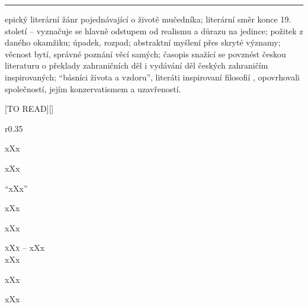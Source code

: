 \documentclass{extarticle} %
\begin{document}
\vfill

\noindent\begin{minipage}{\textwidth}
    {\textcolor{\wpagecolor}{\rule{\linewidth}{0.4pt}}
    \footnotesize
     epický literární žánr pojednávající o životě mučedníka;
     literární směr konce 19. století -- vyznačuje se hlavně odstupem od realismu a důrazu na jedince;
     požitek z daného okamžiku;
     úpadek, rozpad;
     abstraktní myšlení přes skryté významy;
     věcnost bytí, správné poznání věcí samých;
     časopis snažící se povznést českou literaturu o překlady zahraničních děl i vydávání děl českých zahraničím inspirovaných;
     \enquote{básníci života a vzdoru}, literáti inspirovaní filosofií , opovrhovali společností, jejím konzervatismem a uzavřeností.
    }
\end{minipage}

\newpage


\changefontsize{8pt}

[TO READ][\killpage]

\noindent\begin{wrapfigure}{r}{0.35\textwidth}
\tiny

\setlength{\parindent}{3pt}
xXx
\end{wrapfigure}


\noindent xXx



\noindent 
\enquote{xXx}

\noindent 
xXx

\noindent 
xXx

\noindent 
\textsc{xXx --} xXx \\

\noindent 
xXx

\noindent 
xXx

\noindent 
xXx
\end{document}
